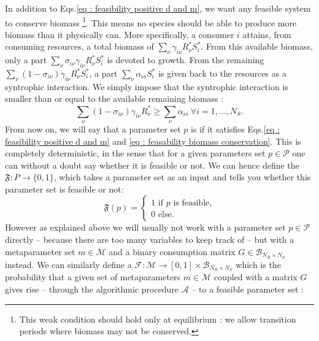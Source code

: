 \documentclass[12pt, titlepage]{report}
\begin{document}
In addition to Eqs.\eqref{eq : feasibility positive d and m}, we want any feasible system to conserve biomass \footnote{This weak condition should hold only at equilibrium : we allow transition periods where biomass may not be conserved.}. This means no species should be able to produce more biomass than it physically can. More specifically, a consumer $i$ attains, from consuming resources, a total biomass of $\sum_\nu \gamma_{i\nu}R^*_\nu S^*_i$.
From this available biomass, only a part $\sum_\nu \sigma_{i\nu}\gamma_{i\nu}R^*_\nu S^*_i$ is devoted to growth. From the remaining $\sum_\nu (1-\sigma_{i\nu})\gamma_{i\nu}R^*_\nu S^*_i$, a part $\sum_\nu \alpha_{\nu i} S^*_i$ is given back to the resources as a syntrophic interaction. We simply impose that the syntrophic interaction is smaller than or equal to the available remaining biomass :
\begin{equation}\label{eq : feasability biomass conservation}
 \sum_\nu (1-\sigma_{i\nu})\gamma_{i\nu}R^*_\nu  \geq \sum_\nu \alpha_{\nu i} \ \forall i=1, \dots, N_S.
\end{equation}
From now on, we will say that a parameter set $p$ is  if it satisfies Eqs.\eqref{eq : feasibility positive d and m} and \eqref{eq : feasability biomass conservation}.
This is completely deterministic, in the sense that for a given parameters set $p \in \mathcal{P}$ one can without a doubt say whether it is feasible or not.
We can hence define the  $\mathfrak{F} : P \rightarrow \{ 0, 1 \}$, which takes a parameter set as an input and tells you whether this parameter set is feasible or not:
\begin{equation}
\mathfrak{F}(p)=
\begin{cases}
1 \text{ if }p \text{ is feasible,} \\
0 \text{ else.}
\end{cases}
\end{equation}
However as explained above we will usually not work with a parameter set $p \in \mathcal{P}$ directly -- because there are too many variables to keep track of -- but with a metaparameter set $m \in \mathcal{M}$ and a binary consumption matrix $G \in \mathcal{B}_{N_R \times N_S}$ instead. We can similarly define a
 $\mathcal{F} : \mathcal{M} \rightarrow [0, 1] \times \mathcal{B}_{N_R \times N_S}$ which is the probability that a given set of metaparameters $m \in \mathcal{M}$ coupled with a matrix $G$ gives rise -- through the algorithmic procedure $\mathcal{A}$ -- to a feasible parameter set :
\end{document}
